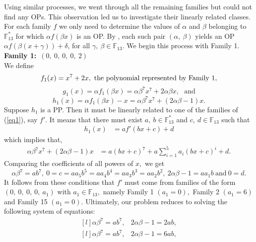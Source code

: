 \documentclass[12pt,a4wide, reqno]{amsart}
\theoremstyle{definition}
\theoremstyle{remark}
\numberwithin{equation}{section}
\begin{document}
Using similar processes, we went through all the remaining families but could not find any OPs. This observation led us to investigate their linearly related classes. For each family $f$ we only need to determine the values of $\alpha$ and $\beta$ belonging to $\mathbb{F}_{13}^*$ for which $\alpha f(\beta x)$ is an OP. By , each such pair $(\alpha,~\beta)$ yields an OP $\alpha f(\beta (x+\gamma))+\delta$, for all $\gamma,~\beta\in\mathbb{F}_{13}.$ We begin this process with Family 1.\\
\textbf{Family 1:}~$(0,~0,~0,~0,~2)$\\ 
 We define 
$$f_1(x)=x^7+2x,~\textup{the polynomial represented by Family 1},$$
$$g_1(x)=\alpha f_1(\beta x)=\alpha \beta^7x^7+2\alpha \beta x,~~~\text{and}$$
$$h_1(x)=\alpha f_1(\beta x)-x=\alpha \beta^7x^7+(2\alpha \beta-1) x.$$
Suppose $h_1$ is a PP. Then it must be linearly related to one of the families of  (\ref{eq1}), say $f'$. It means that there must exist $a,~b\in\mathbb{F}_{13}^*$ and $c,~d\in\mathbb{F}_{13}$ such that
\begin{equation*}
    \begin{aligned}
        h_1(x)&=af'(bx+c)+d
        \end{aligned}
\end{equation*}
which implies that,
\begin{equation*}
    \begin{aligned}
        \alpha \beta^7x^7+(2\alpha \beta-1) x&=a(bx+c)^7+a\sum_{i=1}^{5}a_i(bx+c)^i+d.
        \end{aligned}
\end{equation*}
Comparing the coefficients of all powers of $x,$ we get
$$\alpha \beta^7=ab^7,~0=c=aa_5b^5=aa_4b^4=aa_3b^3=aa_2b^2,~2\alpha \beta-1=aa_1b~\text{and}~0=d.$$
It follows from these conditions that $f'$ must come from families of the form $(0,~0,~0,~0,~a_1)$ with $a_1\in\mathbb{F}_{13},$ namely Family 1 $(a_1=0),$ Family 2 $(a_1=6)$ and Family 15 $(a_1=0).$ Ultimately, our problem reduces to solving the following system of equations:
\begin{equation}\label{eq4}
    \begin{matrix*}[l]
         \alpha \beta ^7=ab^7, & 2\alpha \beta -1=2ab,
    \end{matrix*}
\end{equation}
\begin{equation}\label{eq5}
    \begin{matrix*}[l]
         \alpha \beta ^7=ab^7, & 2\alpha \beta -1=6ab,
    \end{matrix*}
\end{equation}
\end{document}
